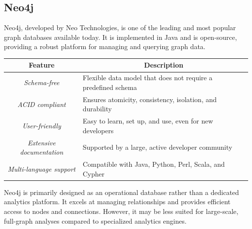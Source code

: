 \subsection{Neo4j}
Neo4j, developed by Neo Technologies, is one of the leading and most popular graph databases available today. 
It is implemented in Java and is open-source, providing a robust platform for managing and querying graph data.
\begin{table}[H]
    \centering
    \begin{tabular}{|c|l|}
    \hline
    \textbf{Feature}                 & \multicolumn{1}{c|}{\textbf{Description}}                                     \\ \hline
    \textit{Schema-free}             & Flexible data model that does not require a predefined schema                  \\ \hline
    \textit{ACID compliant}          & Ensures atomicity, consistency, isolation, and durability                      \\ \hline
    \textit{User-friendly}           & Easy to learn, set up, and use, even for new developers                        \\ \hline
    \textit{Extensive documentation} & Supported by a large, active developer community                                 \\ \hline
    \textit{Multi-language support}  & Compatible with Java, Python, Perl, Scala, and Cypher           \\ \hline
    \end{tabular}
\end{table}
Neo4j is primarily designed as an operational database rather than a dedicated analytics platform. 
It excels at managing relationships and provides efficient access to nodes and connections. 
However, it may be less suited for large-scale, full-graph analyses compared to specialized analytics engines.

